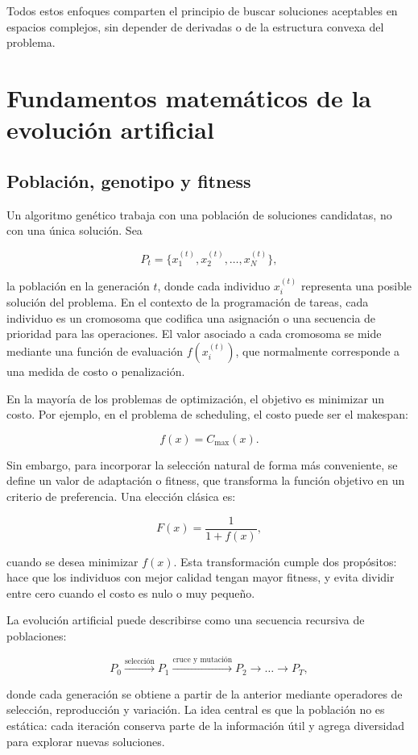 \documentclass[11pt,a4paper]{article}
\begin{document}
Todos estos enfoques comparten el principio de buscar soluciones aceptables en espacios complejos, sin depender de derivadas o de la estructura convexa del problema.

\section{Fundamentos matemáticos de la evolución artificial}

\subsection{Población, genotipo y fitness}

Un algoritmo genético trabaja con una población de soluciones candidatas, no con una única solución. Sea

$$
P_t = \{x_1^{(t)}, x_2^{(t)}, \dots, x_N^{(t)}\},
$$

la población en la generación $t$, donde cada individuo $x_i^{(t)}$ representa una posible solución del problema. En el contexto de la programación de tareas, cada individuo es un cromosoma que codifica una asignación o una secuencia de prioridad para las operaciones. El valor asociado a cada cromosoma se mide mediante una función de evaluación $f(x_i^{(t)})$, que normalmente corresponde a una medida de costo o penalización.

En la mayoría de los problemas de optimización, el objetivo es minimizar un costo. Por ejemplo, en el problema de scheduling, el costo puede ser el makespan:

$$
f(x) = C_{\max}(x).
$$

Sin embargo, para incorporar la selección natural de forma más conveniente, se define un valor de adaptación o fitness, que transforma la función objetivo en un criterio de preferencia. Una elección clásica es:

$$
F(x) = \frac{1}{1 + f(x)},
$$

cuando se desea minimizar $f(x)$. Esta transformación cumple dos propósitos: hace que los individuos con mejor calidad tengan mayor fitness, y evita dividir entre cero cuando el costo es nulo o muy pequeño.

La evolución artificial puede describirse como una secuencia recursiva de poblaciones:

$$
P_0 \xrightarrow{\text{selección}} P_1 \xrightarrow{\text{cruce y mutación}} P_2 \rightarrow \dots \rightarrow P_T,
$$

donde cada generación se obtiene a partir de la anterior mediante operadores de selección, reproducción y variación. La idea central es que la población no es estática: cada iteración conserva parte de la información útil y agrega diversidad para explorar nuevas soluciones.
\end{document}

